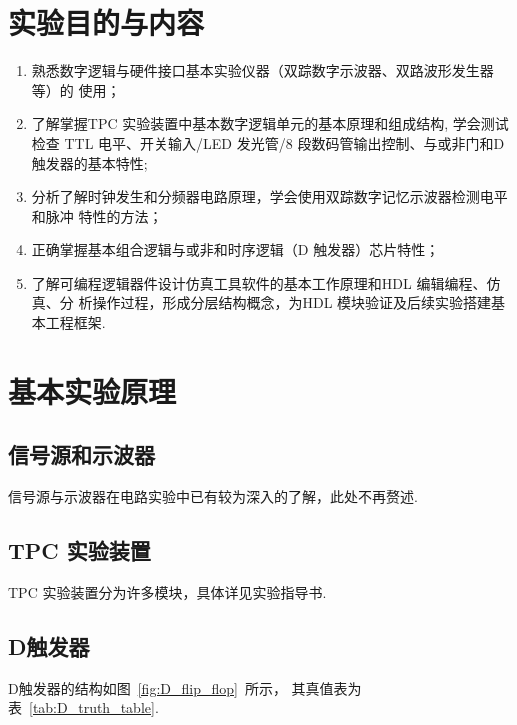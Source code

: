 \documentclass[11pt]{SEU-Digital-Report}
\begin{document}
    \exptitlepage

    \tableofcontents
    \newpage

    \section{实验目的与内容}
        
        \begin{enumerate}
            \item 熟悉数字逻辑与硬件接口基本实验仪器（双踪数字示波器、双路波形发生器等）的
            使用；
            \item 了解掌握TPC 实验装置中基本数字逻辑单元的基本原理和组成结构, 学会测试检查
            TTL 电平、开关输入/LED 发光管/8 段数码管输出控制、与或非门和D 触发器的基本特性;
            \item 分析了解时钟发生和分频器电路原理，学会使用双踪数字记忆示波器检测电平和脉冲
            特性的方法；
            \item 正确掌握基本组合逻辑与或非和时序逻辑（D 触发器）芯片特性；
            \item 了解可编程逻辑器件设计仿真工具软件的基本工作原理和HDL 编辑编程、仿真、分
            析操作过程，形成分层结构概念，为HDL 模块验证及后续实验搭建基本工程框架.
        \end{enumerate}

    \section{基本实验原理}
        
        \subsection{信号源和示波器}

            信号源与示波器在电路实验中已有较为深入的了解，此处不再赘述.

        \subsection{TPC 实验装置}

            TPC 实验装置分为许多模块，具体详见实验指导书\cite{guide}.

        \subsection{D触发器}

            D触发器的结构如图~\ref{fig:D_flip_flop}~所示，
            其真值表为表~\ref{tab:D_truth_table}.
\end{document}
